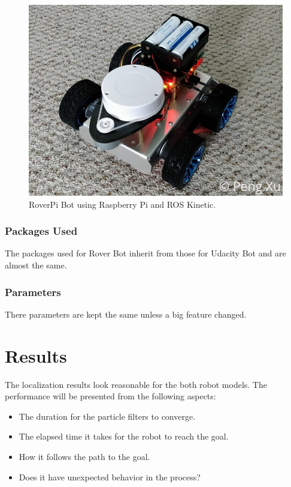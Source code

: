 \documentclass[10pt,journal,compsoc]{IEEEtran}
\begin{document}
\begin{figure}[thpb]
    \centering
    \includegraphics[width=\linewidth]{images/roverpi-18650.jpg}
    \caption{RoverPi Bot using Raspberry Pi and ROS Kinetic.}
    \label{fig:roverpi-18650}
\end{figure}

\subsubsection{Packages Used}

The packages used for Rover Bot inherit from those for Udacity Bot and are almost the same.

\subsubsection{Parameters}

There parameters are kept the same unless a big feature changed.

\section{Results}

The localization results look reasonable for the both robot models. The performance will be presented from the following aspects:

\begin{itemize}
    \item The duration for the particle filters to converge.
    \item The elapsed time it takes for the robot to reach the goal.
    \item How it follows the path to the goal.
    \item Does it have unexpected behavior in the process?
\end{itemize}
\end{document}
